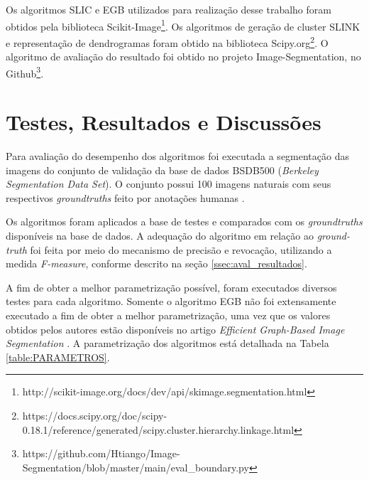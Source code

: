 \begin{document}
Os algoritmos SLIC e EGB utilizados para realização desse trabalho foram obtidos pela biblioteca Scikit-Image\footnote{http://scikit-image.org/docs/dev/api/skimage.segmentation.html}.
Os algoritmos de geração de cluster SLINK e representação de dendrogramas foram obtido na biblioteca Scipy.org\footnote{https://docs.scipy.org/doc/scipy-0.18.1/reference/generated/scipy.cluster.hierarchy.linkage.html}. 
O algoritmo de avaliação do resultado foi obtido no projeto Image-Segmentation, no Github\footnote{https://github.com/Htiango/Image-Segmentation/blob/master/main/eval\_boundary.py}. 





\section{Testes, Resultados e Discussões} \label{sec:testes}

Para avaliação do desempenho dos algoritmos foi executada a segmentação das imagens do conjunto de validação da base de dados  BSDB500 (\textit{Berkeley Segmentation Data Set}). O conjunto possui 100 imagens naturais com seus respectivos \textit{groundtruths} feito por anotações humanas \cite{BSDS500}. 

Os algoritmos foram aplicados a base de testes e comparados com os \textit{groundtruths} disponíveis na base de dados. A adequação do algoritmo em relação ao \textit{ground-truth} foi feita por meio do mecanismo de precisão e revocação, utilizando a medida \textit{F-measure}, conforme descrito na seção \ref{ssec:aval_resultados}.

A  fim de obter a melhor parametrização possível, foram executados diversos testes para cada algoritmo. Somente o algoritmo EGB não foi extensamente executado a fim de obter a melhor parametrização, uma vez que os valores obtidos pelos autores estão disponíveis no artigo \textit{Efficient Graph-Based Image Segmentation} \cite{FELZENSZWALB}. A parametrização dos algoritmos está detalhada na Tabela \ref{table:PARAMETROS}.
\end{document}

